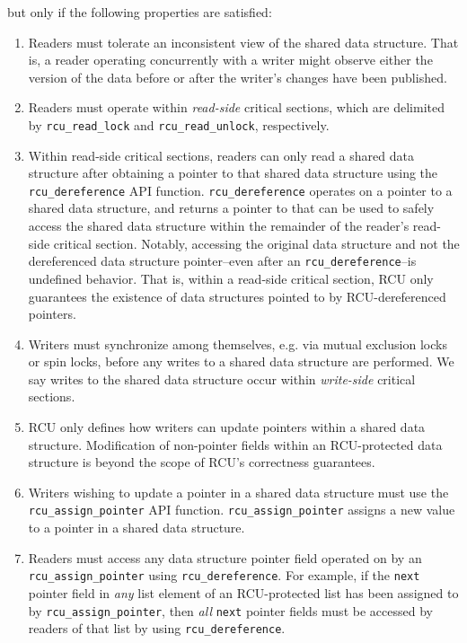 \documentclass[preprint]{sigplanconf}
\begin{document}
but only if the following properties are satisfied: \begin{enumerate}
	\item Readers must tolerate an inconsistent view of the shared data structure. That is, a reader operating concurrently with a writer might observe either the version of the data before or after the writer's changes have been published.
	\item Readers must operate within \emph{read-side} critical sections, which are delimited by \texttt{rcu\_read\_lock} and \texttt{rcu\_read\_unlock}, respectively.
	\item Within read-side critical sections, readers can only read a shared data structure after obtaining a pointer to that shared data structure using the \texttt{rcu\_dereference} API function. \texttt{rcu\_dereference} operates on a pointer to a shared data structure, and returns a pointer to that can be used to safely access the shared data structure within the remainder of the reader's read-side critical section. Notably, accessing the original data structure and not the dereferenced data structure pointer--even after an \texttt{rcu\_dereference}--is undefined behavior. That is, within a read-side critical section, RCU only guarantees the existence of data structures pointed to by RCU-dereferenced pointers.
	\item Writers must synchronize among themselves, e.g. via mutual exclusion locks or spin locks, before any writes to a shared data structure are performed. We say writes to the shared data structure occur within \emph{write-side} critical sections.
	\item RCU only defines how writers can update pointers within a shared data structure. Modification of non-pointer fields within an RCU-protected data structure is beyond the scope of RCU's correctness guarantees.
	\item Writers wishing to update a pointer in a shared data structure must use the \texttt{rcu\_assign\_pointer} API function. \texttt{rcu\_assign\_pointer} assigns a new value to a pointer in a shared data structure.
	\item Readers must access any data structure pointer field operated on by an \texttt{rcu\_\linebreak[0]assign\_pointer} using \texttt{rcu\_\linebreak[0]dereference}. For example, if the \texttt{next} pointer field in \emph{any} list element of an RCU-protected list has been assigned to by \texttt{rcu\_assign\_\linebreak[0]pointer}, then \emph{all} \texttt{next} pointer fields must be accessed by readers of that list by using \texttt{rcu\_dereference}.
\end{enumerate}
\end{document}
